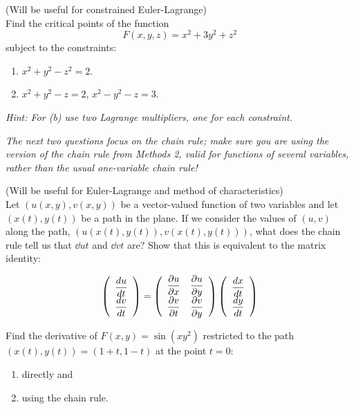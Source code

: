 \documentclass[12pt]{article}
\begin{document}
\bigskip

\begin{question}(Will be useful for constrained Euler-Lagrange)\\
Find the critical points of the function
\[F(x,y,z)=x^2+3y^2+z^2\]
subject to the constraints:
\begin{enumerate}
\item[(a)] $x^2+y^2-z^2=2$.
\item[(b)] $x^2+y^2-z=2$, $x^2-y^2-z=3$.
\end{enumerate}
{\em Hint: For (b) use two Lagrange multipliers, one for each constraint.}
\end{question}

\bigskip

{\em The next two questions focus on the chain rule; make sure you are using the version of the chain rule from Methods 2, valid for functions of several variables, rather than the usual one-variable chain rule!}

\bigskip

\begin{question}(Will be useful for Euler-Lagrange and method of characteristics)\\
Let $(u(x,y),v(x,y))$ be a vector-valued function of two variables and let
$(x(t),y(t))$ be a path in the plane. If we consider the values of $(u,v)$
along the path, $(u(x(t),y(t)),v(x(t),y(t)))$, what does the chain rule
tell us that $\dd{u}{t}$ and $\dd{v}{t}$ are? Show that this is equivalent
to the matrix identity:

\[
\left(
   \begin{array}{c}
        \dfrac{d u}{d t}\\
        \dfrac{d v}{d t}
   \end{array}
\right)   =   \left(
                 \begin{array}{cc}
                      \dfrac{\partial u}{\partial x} & \dfrac{\partial u}{\partial y}\\
                      \dfrac{\partial v}{\partial t} & \dfrac{\partial v}{\partial y}
                 \end{array}
              \right)                       \left(
                                               \begin{array}{c}
                                                    \dfrac{d x}{d t}\\
                                                    \dfrac{d y}{d t}
                                               \end{array}
                                            \right)
\]

Find the derivative of $F(x,y)=\sin(xy^2)$ restricted to the path $(x(t),y(t))=(1+t,1-t)$ at the point $t=0$:
\begin{enumerate}
 \item[(a)] directly and
 \item[(b)] using the chain rule.
\end{enumerate}
\end{question}
\end{document}
